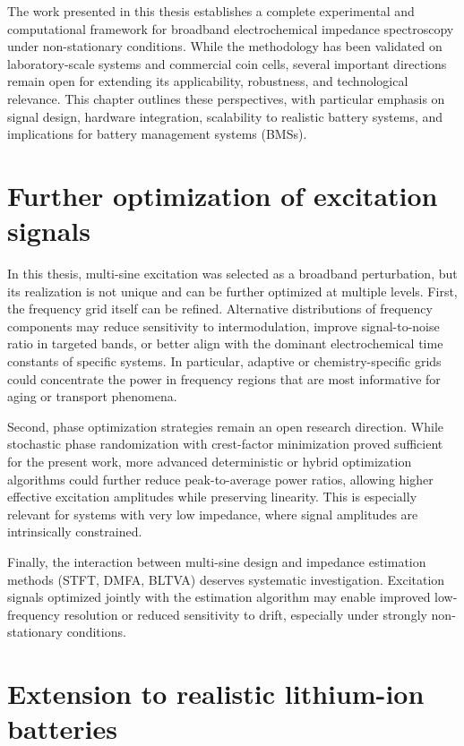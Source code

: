 The work presented in this thesis establishes a complete experimental and computational framework for broadband electrochemical impedance spectroscopy under non-stationary conditions. While the methodology has been validated on laboratory-scale systems and commercial coin cells, several important directions remain open for extending its applicability, robustness, and technological relevance. This chapter outlines these perspectives, with particular emphasis on signal design, hardware integration, scalability to realistic battery systems, and implications for battery management systems (BMSs).

\section{Further optimization of excitation signals}

In this thesis, multi-sine excitation was selected as a broadband perturbation, but its realization is not unique and can be further optimized at multiple levels.
First, the frequency grid itself can be refined. Alternative distributions of frequency components may reduce sensitivity to intermodulation, improve signal-to-noise ratio in targeted bands, or better align with the dominant electrochemical time constants of specific systems. In particular, adaptive or chemistry-specific grids could concentrate the power in frequency regions that are most informative for aging or transport phenomena.

Second, phase optimization strategies remain an open research direction. While stochastic phase randomization with crest-factor minimization proved sufficient for the present work, more advanced deterministic or hybrid optimization algorithms could further reduce peak-to-average power ratios, allowing higher effective excitation amplitudes while preserving linearity. This is especially relevant for systems with very low impedance, where signal amplitudes are intrinsically constrained.

Finally, the interaction between multi-sine design and impedance estimation methods (STFT, DMFA, BLTVA) deserves systematic investigation. Excitation signals optimized jointly with the estimation algorithm may enable improved low-frequency resolution or reduced sensitivity to drift, especially under strongly non-stationary conditions.

\section{Extension to realistic lithium-ion batteries}

